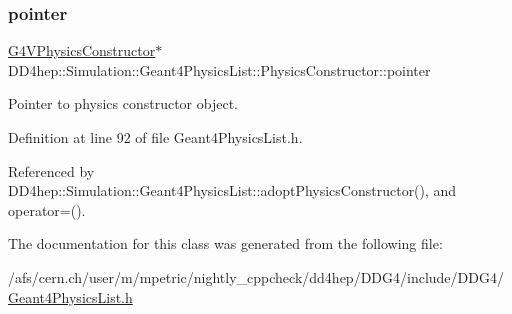 \subsubsection{\texorpdfstring{pointer}{pointer}}
{\footnotesize\ttfamily \hyperlink{class_g4_v_physics_constructor}{G4\+V\+Physics\+Constructor}$\ast$ D\+D4hep\+::\+Simulation\+::\+Geant4\+Physics\+List\+::\+Physics\+Constructor\+::pointer}



Pointer to physics constructor object. 



Definition at line 92 of file Geant4\+Physics\+List.\+h.



Referenced by D\+D4hep\+::\+Simulation\+::\+Geant4\+Physics\+List\+::adopt\+Physics\+Constructor(), and operator=().



The documentation for this class was generated from the following file\+:\begin{DoxyCompactItemize}
\item 
/afs/cern.\+ch/user/m/mpetric/nightly\+\_\+cppcheck/dd4hep/\+D\+D\+G4/include/\+D\+D\+G4/\hyperlink{_geant4_physics_list_8h}{Geant4\+Physics\+List.\+h}\end{DoxyCompactItemize}
